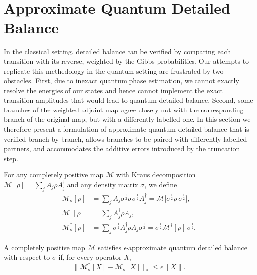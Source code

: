 \section{Approximate Quantum Detailed Balance}
\label{section:detailedbalancedef}
In the classical setting, detailed balance can be verified by comparing each transition with its reverse, weighted by the Gibbs probabilities. Our attempts to replicate this methodology in the quantum setting are frustrated by two obstacles. First, due to inexact quantum phase estimation, we cannot exactly resolve the energies of our states and hence cannot implement the exact transition amplitudes that would lead to quantum detailed balance. Second, some branches of the weighted adjoint map agree closely not with the corresponding branch of the original map, but with a differently labelled one. In this section we therefore present a formulation of approximate quantum detailed balance that is verified branch by branch, allows branches to be paired with differently labelled partners, and accommodates the additive errors introduced by the truncation step.

For any completely positive map $\mathcal{M}$ with Kraus decomposition $\mathcal{M}[\rho] = \sum_{j} A_{j}\rho A^{\dagger}_{j}$ and any density matrix $\sigma$, we define
\begin{align}
    \mathcal{M}_{\sigma}[\rho] &= \sum_{j} A_{j}\sigma^{\frac{1}{2}}\rho\,\sigma^{\frac{1}{2}} A^{\dagger}_{j} = \mathcal{M}\big[\sigma^{\frac{1}{2}}\rho\,\sigma^{\frac{1}{2}}\big],\\
    \mathcal{M}^{\dagger}[\rho] &= \sum_j A^{\dagger}_j \rho A_j,\\
    \mathcal{M}^*_{\sigma}[\rho] &= \sum_{j} \sigma^{\frac{1}{2}}A^{\dagger}_{j}\rho A_{j}\sigma^{\frac{1}{2}} = \sigma^{\frac{1}{2}}\mathcal{M}^{\dagger}[\rho]\,\sigma^{\frac{1}{2}}.
\end{align}

\begin{definition}
\label{def:approxdb}
A completely positive map $\mathcal{M}$ satisfies $\epsilon$-approximate quantum
detailed balance with respect to $\sigma$ if, for every operator $X$,
\begin{equation}
    \|\mathcal{M}^*_{\sigma}[X] - \mathcal{M}_{\sigma}[X]\|_* \leq \epsilon\|X\|.
\end{equation}
\end{definition}

